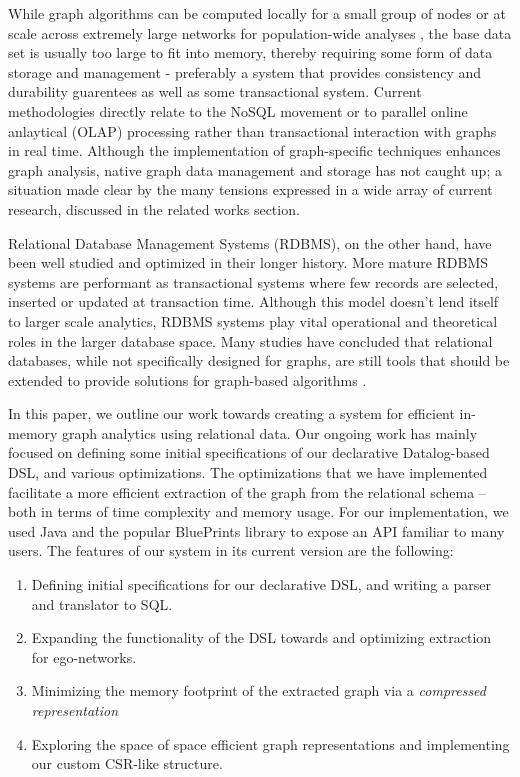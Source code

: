 \documentclass[11pt,letterpaper]{article}
\begin{document}
While graph algorithms can be computed locally for a small group of nodes \cite{jadhav_comparative_2014} or at scale across extremely large networks for population-wide analyses \cite{cuzzocrea_big_2014}, the base data set is usually too large to fit into memory, thereby requiring some form of data storage and management - preferably a system that provides consistency and durability guarentees as well as some transactional system. Current methodologies directly relate to the NoSQL movement or to parallel online anlaytical (OLAP) processing rather than transactional interaction with graphs in real time. Although the implementation of graph-specific techniques enhances graph analysis, native graph data management and storage has not caught up; a situation made clear by the many tensions expressed in a wide array of current research, discussed in the related works section.

Relational Database Management Systems (RDBMS), on the other hand, have been well studied and optimized in their longer history. More mature RDBMS systems are performant as transactional systems where few records are selected, inserted or updated at transaction time. Although this model doesn't lend itself to larger scale analytics, RDBMS systems play vital operational and theoretical roles in the larger database space. Many studies have concluded that relational databases, while not specifically designed for graphs, are still tools that should be extended to provide solutions for graph-based algorithms \cite{welc_graph_2013,najork_hammers_2012,vicknair_comparison_2010}.


In this paper, we outline our work towards creating a system for efficient in-memory graph analytics using relational data. Our ongoing work has mainly focused on defining some initial specifications of our declarative Datalog-based DSL, and various optimizations. The optimizations that we have implemented facilitate a more efficient extraction of the graph from the relational schema -- both in terms of time complexity and memory usage. For our implementation, we used Java and the popular BluePrints library to expose an API familiar to many users. The features of our system in its current version are the following:\\

\begin{enumerate}

	\item Defining initial specifications for our declarative DSL, and writing a parser and translator to SQL.
	\item Expanding the functionality of the DSL towards and optimizing extraction for ego-networks.
	\item Minimizing the memory footprint of the extracted graph via a \textit{compressed representation}
	\item Exploring the space of space efficient graph representations and implementing our custom CSR-like structure. %

\end{enumerate}
\end{document}
